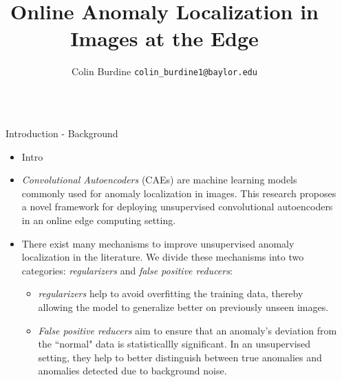 \documentclass[final,hyperref={pdfpagelabels=false}]{beamer}
\title{\Huge Online Anomaly Localization in \\ Images at the Edge} %
\author{Colin Burdine \qquad\quad \texttt{colin\_burdine1@baylor.edu}} %
\institute{SULI Intern $\mid$ Argonne National Laboratory $\mid$ MCS Division} %
\begin{document}

\begin{frame}[t] %

\begin{columns}[t] %

\begin{column}{.02\textwidth}\end{column} %

\begin{column}{.465\textwidth} %

            
\begin{block}{Introduction - Background}
\begin{itemize}
\item Intro \\[4mm]

\item \textit{Convolutional Autoencoders} (CAEs) are machine learning models commonly used for anomaly localization in images.  This research proposes a novel framework for deploying unsupervised convolutional autoencoders in an online edge computing setting.\\[4mm]

\item There exist many mechanisms to improve unsupervised anomaly localization in the literature. We divide these mechanisms into two categories: \textit{regularizers} and \textit{false positive reducers}:\\[4mm]
\begin{itemize}
\item \textit{regularizers} help to avoid overfitting the training data, thereby allowing the model to generalize better on previously unseen images.

\item \textit{False positive reducers} aim to ensure that an anomaly's deviation from the ``normal" data is statisticallly significant. In an unsupervised setting, they help to better distinguish between true anomalies and anomalies detected due to background noise.
\end{itemize}


\end{itemize}
\end{block}
\end{column}
\end{columns}
\end{frame}
\end{document}
